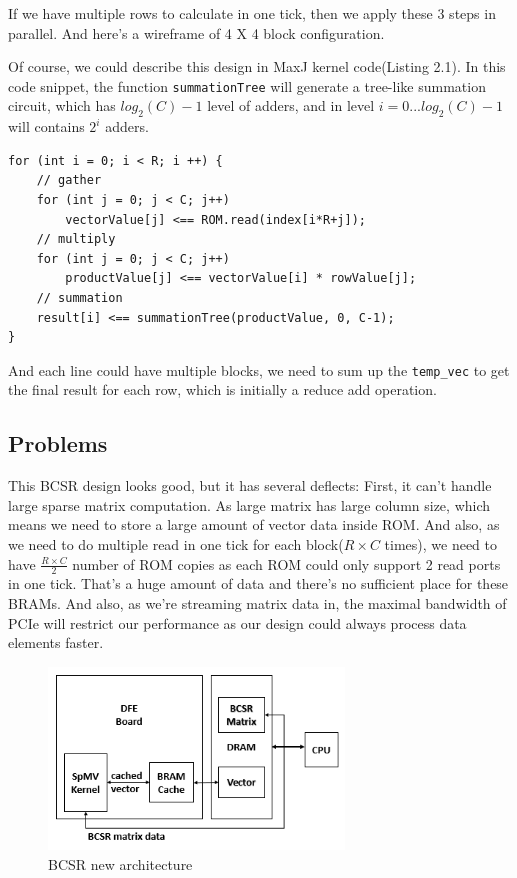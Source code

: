 \documentclass[a4paper, 10pt]{report}
\begin{document}
If we have multiple rows to calculate in one tick, then we apply these 3 steps in parallel. And here's a wireframe of 4 X 4 block configuration.

Of course, we could describe this design in MaxJ kernel code(Listing 2.1). In this code snippet, the function \lstinline{summationTree} will generate a tree-like summation circuit, which has $log_2(C)-1$ level of adders, and in level $i = 0...log_2(C)-1$ will contains $2^i$ adders.

\begin{lstlisting}[caption=BCSR kernel]
for (int i = 0; i < R; i ++) {
	// gather	
	for (int j = 0; j < C; j++)	
		vectorValue[j] <== ROM.read(index[i*R+j]);
	// multiply
	for (int j = 0; j < C; j++)
		productValue[j] <== vectorValue[i] * rowValue[j];
	// summation
	result[i] <== summationTree(productValue, 0, C-1);
}
\end{lstlisting}

And each line could have multiple blocks, we need to sum up the \lstinline{temp_vec} to get the final result for each row, which is initially a reduce add operation. 

\subsection{Problems}

This BCSR design looks good, but it has several deflects: First, it can't handle large sparse matrix computation. As large matrix has large column size, which means we need to store a large amount of vector data inside ROM. And also, as we need to do multiple read in one tick for each block($R\times C$ times), we need to have $\frac{R\times C}{2}$ number of ROM copies as each ROM could only support 2 read ports in one tick. That's a huge amount of data and there's no sufficient place for these BRAMs. And also, as we're streaming matrix data in, the maximal bandwidth of PCIe will restrict our performance as our design could always process data elements faster.

\begin{figure}[h!]
  \caption{BCSR new architecture}
  \centering
    \includegraphics[width=0.7\textwidth]{bcsr-opt}
\end{figure}
\end{document}
